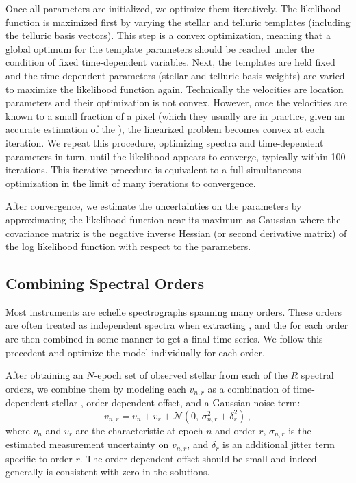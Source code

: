 \documentclass[twocolumn]{aastex62}
\begin{document}
Once all parameters are initialized, we optimize them iteratively. 
The likelihood function is maximized first by varying the stellar and telluric templates (including the telluric basis vectors). 
This step is a convex optimization, meaning that a global optimum for the template parameters should be reached under the condition of fixed time-dependent variables. 
Next, the templates are held fixed and the time-dependent parameters (stellar \RVs and telluric basis weights) are varied to maximize the likelihood function again. 
Technically the velocities are location parameters and their optimization is not convex.
However, once the velocities are known to a small fraction of a pixel (which they usually are in practice, given an accurate estimation of the \BERV), the linearized problem becomes convex at each iteration.
We repeat this procedure, optimizing spectra and time-dependent parameters in turn, until the likelihood appears to converge, typically within 100 iterations.
This iterative procedure is equivalent to a full simultaneous optimization in the limit of many iterations to convergence.

After convergence, we estimate the uncertainties on the parameters by
approximating the likelihood function near its maximum as Gaussian where the
covariance matrix is the negative inverse Hessian (or second derivative
matrix) of the log likelihood function with respect to the parameters.

\subsection{Combining Spectral Orders}
\label{s:combining-orders}

Most \EPRV instruments are echelle spectrographs spanning many orders. 
These orders are often treated as independent spectra when extracting \RVs, and the \RVs for each order are then combined in some manner to get a final time series. 
We follow this precedent and optimize the \wobble model individually for each order. 

After obtaining an $N$-epoch set of observed stellar \RVs from each of the $R$ spectral orders, we combine them by modeling each \RV $v_{n,r}$ as a combination of time-dependent stellar \RV, order-dependent \RV offset, and a Gaussian noise term:
\begin{equation}
v_{n,r} = v_n + v_r + \mathcal{N}(0,\,\sigma_{n,r}^{2} + \delta_r^2 )\,,
\end{equation}
where $v_n$ and $v_r$ are the characteristic \RVs at epoch $n$ and order $r$, $\sigma_{n,r}$ is the estimated measurement uncertainty on $v_{n,r}$, and $\delta_r$ is an additional jitter term specific to order $r$. 
The order-dependent \RV offset should be small and indeed generally is consistent with zero in the solutions.%
\end{document}
